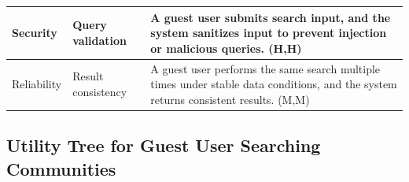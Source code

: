 \documentclass{article}
\begin{document}
\begin{table}[H]
\begin{tabular}{|p{3cm}|p{4cm}|p{7cm}|}
        Security
                                   & Query validation
                                   & A guest user submits search input, and the system sanitizes input to prevent injection or malicious queries. (H,H)                                     \\
        \hline

        Reliability
                                   & Result consistency
                                   & A guest user performs the same search multiple times under stable data conditions, and the system returns consistent results. (M,M)                    \\
        \hline
    \end{tabular}
\end{table}

\subsection{Utility Tree for Guest User Searching Communities}
\end{document}
